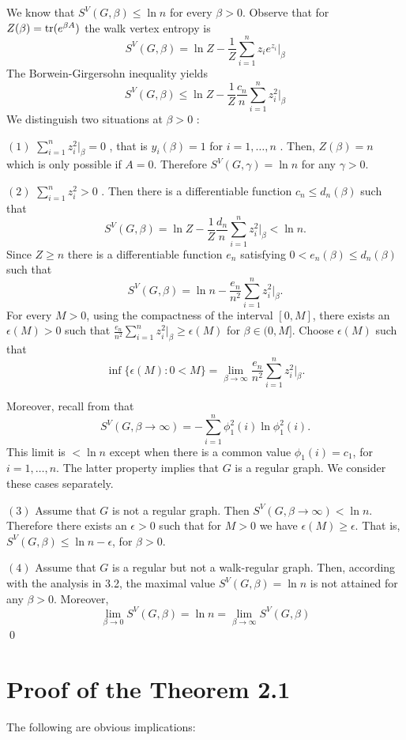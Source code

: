 \documentclass[12pt]{amsart}
\newcommand{\tr}{\hbox{\rm tr}}
\begin{document}
We know that $S^V(G,\beta) \leq \ln n$  for every $\beta>0$. Observe that for 
$Z(\beta)=\tr(e^{\beta A})$ the walk vertex entropy is
$$S^V(G,\beta) =\ln Z-\frac{1}{Z} \sum\limits_{i=1}^n z_i e^{z_i}|_{\beta}$$
\noindent
The Borwein-Girgersohn inequality yields
$$S^V(G,\beta) \leq \ln Z-\frac{1}{Z} \frac{c_n}{n}\sum\limits_{i=1}^n z_i^2|_{\beta}$$
\noindent 
We distinguish two situations at $\beta>0$ :

$(1)$ $\sum\limits_{i=1}^n z_i^2|_{\beta}	=0$ , that is $y_i(\beta)=1$  for $i=1,\ldots,n$ . Then, $Z(\beta)=n$ which is only possible if $A=0$. Therefore $S^V(G,\gamma)=\ln n$ for any 
$\gamma>0$.
 
$(2)$ $\sum\limits_{i=1}^n z_i^2>0$	. Then there is a differentiable function $c_n \leq d_n(\beta)$  such that
$$S^V(G,\beta) = \ln Z-\frac{1}{Z} \frac{d_n}{n}\sum\limits_{i=1}^n z_i^2|_{\beta}< \ln n.$$
\noindent
Since $Z \geq n$  there is a differentiable function $e_n$  satisfying 
$0<e_n(\beta) \leq d_n(\beta)$  such that
$$S^V(G,\beta) = \ln n- \frac{e_n}{n^2}\sum\limits_{i=1}^n z_i^2|_{\beta}.$$
\noindent
For every $M>0$, using the compactness of the interval $[0,M]$, there exists an 
$\epsilon(M)>0$  such that $ \frac{e_n}{n^2}\sum\limits_{i=1}^n z_i^2|_{\beta}\geq \epsilon(M)$  for $\beta \in (0,M]$. 
Choose $\epsilon(M)$ such that
$$\inf \{\epsilon(M):0<M \}=\lim\limits_{\beta \to \infty} \frac{e_n}{n^2}\sum\limits_{i=1}^n z_i^2|_{\beta}.$$

Moreover, recall from \cite{6} that
$$S^V(G,\beta \to \infty)=-\sum\limits_{i=1}^n \phi_1^2(i) \ln \phi_1^2(i).$$
\noindent
This limit is $< \ln n$  except when there is a common value $\phi_1(i)=c_1$, for $i=1,\ldots,n$. The latter property implies that $G$  is a regular graph. We consider these cases separately.

$(3)$	Assume that $G$  is not a regular graph. Then $S^V(G,\beta \to \infty)< \ln n$.  Therefore there exists an $\epsilon>0$  such that for $M>0$  we have $\epsilon(M) \geq \epsilon$.
That is, $S^V(G,\beta) \leq \ln n-\epsilon$, for $\beta>0$.

$(4)$	Assume that $G$  is a regular but not a walk-regular graph. Then, according 
with the analysis in 3.2, the maximal value $S^V(G,\beta)=\ln n$  is not attained for any $\beta>0$. Moreover,  
$$\lim_{\beta \to 0} S^V(G,\beta)=\ln n=\lim_{\beta \to \infty} S^V(G,\beta)$$
 \qed


\section{ Proof of the Theorem 2.1} The following are obvious implications:
\end{document}
